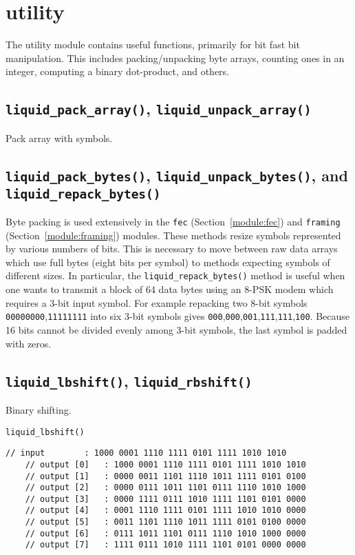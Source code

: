 % 
%

\newpage
\section{utility}
\label{module:utility}
The utility module contains useful functions, primarily for bit fast bit
manipulation.
This includes packing/unpacking byte arrays, counting ones in an integer,
computing a binary dot-product, and others.

\subsection{{\tt liquid\_pack\_array()},
            {\tt liquid\_unpack\_array()}}
\label{module:utility:pack_array}
Pack array with symbols.


\subsection{{\tt liquid\_pack\_bytes()},
            {\tt liquid\_unpack\_bytes()}, and
            {\tt liquid\_repack\_bytes()}}
\label{module:utility:pack_bytes}
Byte packing is used extensively in the
{\tt fec} (Section~\ref{module:fec}) and
{\tt framing} (Section~\ref{module:framing}) modules.
These methods resize symbols represented by various numbers of bits.
This is necessary to move between raw data arrays which use full bytes (eight
bits per symbol) to methods expecting symbols of different sizes.
In particular, the {\tt liquid\_repack\_bytes()} method is useful when one wants
to transmit a block of 64 data bytes using an 8-PSK modem which requires a
3-bit input symbol.
For example repacking two 8-bit symbols {\tt 00000000},{\tt 11111111} into six
3-bit symbols gives
{\tt 000},{\tt 000},{\tt 001},{\tt 111},{\tt 111},{\tt 100}.
Because 16 bits cannot be divided evenly among 3-bit symbols, the last symbol
is padded with zeros.


\subsection{{\tt liquid\_lbshift()},
            {\tt liquid\_rbshift()}}
\label{module:utility:bshift}
Binary shifting.

{\tt liquid\_lbshift()}
\begin{Verbatim}[fontsize=\small]
    // input        : 1000 0001 1110 1111 0101 1111 1010 1010
    // output [0]   : 1000 0001 1110 1111 0101 1111 1010 1010
    // output [1]   : 0000 0011 1101 1110 1011 1111 0101 0100
    // output [2]   : 0000 0111 1011 1101 0111 1110 1010 1000
    // output [3]   : 0000 1111 0111 1010 1111 1101 0101 0000
    // output [4]   : 0001 1110 1111 0101 1111 1010 1010 0000
    // output [5]   : 0011 1101 1110 1011 1111 0101 0100 0000
    // output [6]   : 0111 1011 1101 0111 1110 1010 1000 0000
    // output [7]   : 1111 0111 1010 1111 1101 0101 0000 0000
\end{Verbatim}

